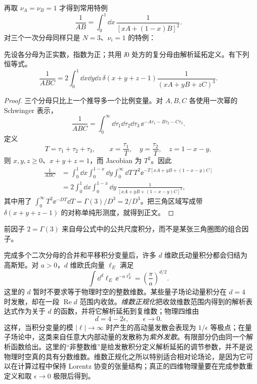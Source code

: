 再取 $\nu_A=\nu_B=1$ 才得到常用特例
\begin{equation}
 {
 \frac1{AB}
 =\int_0^1\dd x\,
 \frac1{[xA+(1-x)B]^2}.}
 \label{eq:feynman-parameter-proof-r9}
\end{equation}
对三个一次分母同样只是 $N=3$、$\nu_i=1$ 的特例：
\begin{proposition}[三个分母的单纯形参数公式]
先设各分母为正实数，指数为正；共用 $\ii0$ 处方的复分母由解析延拓定义。有下列恒等式。
\begin{equation}
 {
 \frac1{ABC}
 =2\int_0^1\dd x\dd y\dd z\,
 \delta(x+y+z-1)
 \frac1{(xA+yB+zC)^3}.}
 \label{eq:feynman-three-denominator-r14}
\end{equation}
\end{proposition}
\begin{proof}
三个分母只比上一个推导多一个比例变量。对 $A,B,C$ 各使用一次幂的 Schwinger 表示，
\begin{equation*}
 \frac1{ABC}
 =\int_0^\infty\dd\tau_1\dd\tau_2\dd\tau_3\,
 \ee^{-A\tau_1-B\tau_2-C\tau_3}.
\end{equation*}
定义
\begin{equation*}
 T=\tau_1+\tau_2+\tau_3,
 \qquad x=\frac{\tau_1}{T},
 \quad y=\frac{\tau_2}{T},
 \quad z=1-x-y,
\end{equation*}
则 $x,y,z\ge0$、$x+y+z=1$，而 Jacobian 为 $T^2$。因此
\begin{align*}
 \frac1{ABC}
 &=\int_0^1\dd x\int_0^{1-x}\dd y
 \int_0^\infty\dd T\,T^2
 \ee^{-T[xA+yB+(1-x-y)C]}\\
 &=2\int_0^1\dd x\int_0^{1-x}\dd y\,
 \frac1{[xA+yB+(1-x-y)C]^3},
\end{align*}
其中用了 $\int_0^\infty T^2\ee^{-DT}\dd T=\Gamma(3)/D^3=2/D^3$。把三角区域写成带 $\delta(x+y+z-1)$ 的对称单纯形测度，就得到正文。
\end{proof}
前因子 $2=\Gamma(3)$ 来自母公式中的公共尺度积分，而不是某张三角圈图的组合因子。

完成多个二次分母的合并和平移积分变量后，许多 $d$ 维欧氏动量积分都会归结为高斯矩。对 $a>0$，$d$ 维欧氏向量 $\ell_E$ 满足
\begin{equation}
 {
 \int\dd^d \ell_E\,\ee^{-a\ell_E^2}
 =\left(\frac\pi a\right)^{d/2}.}
 \label{eq:d-dimensional-gaussian-r9}
\end{equation}
这里的 $d$ 暂时不要求等于物理时空的整数维数。某些量子场论动量积分在 $d=4$ 时发散，却在一段 $\operatorname{Re}d$ 范围内收敛。\emph{维数正规化}把收敛维数范围内得到的解析表达式作为关于 $d$ 的函数，并将它解析延拓到复维数；物理四维由
\begin{equation*}
 d=4-2\epsilon,
 \qquad \epsilon\to0.
\end{equation*}
这样，当积分变量的模 $|\ell|\to\infty$ 时产生的高动量发散会表现为 $1/\epsilon$ 等极点；在量子场论中，这类来自任意大内部动量的发散称为\emph{紫外发散}。有限部分仍由同一个解析函数给出。这里的“非整数维”是给发散积分定义解析延拓的调节参数，并不是说物理时空真的具有分数维数。维数正规化之所以特别适合相对论场论，是因为它可以在计算过程中保持 Lorentz 协变的张量结构；真正的四维物理量要在完成参数重定义和取 $\epsilon\to0$ 极限后得到。

